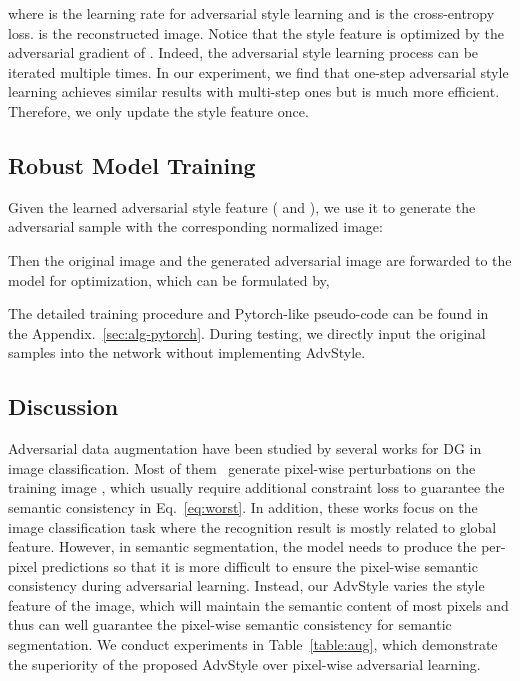 \documentclass{article}
\newcommand{\ours}{AdvStyle\xspace}
\begin{document}
where  is the learning rate for adversarial style learning and  is the cross-entropy loss.  is the reconstructed image. Notice that the style feature is optimized by the adversarial gradient of . Indeed, the adversarial style learning process can be iterated multiple times.
In our experiment, we find that one-step adversarial style learning achieves similar results with multi-step ones but is much more efficient. Therefore, we only update the style feature once.

\subsection{Robust Model Training}

Given the learned adversarial style feature ( and ), we use it to generate the adversarial sample  with the corresponding normalized image:

Then the original image  and the generated adversarial image  are forwarded to the model for optimization, which can be formulated by,

The detailed training procedure and Pytorch-like pseudo-code can be found in the Appendix.~\ref{sec:alg-pytorch}. During testing, we directly input the original samples into the network without implementing \ours.


\subsection{Discussion} 

Adversarial data augmentation have been studied by several works for DG in image classification. Most of them~\cite{qiao2020learning, volpi2018generalizing} generate pixel-wise perturbations on the training image , which usually require additional constraint loss to guarantee the semantic consistency in Eq.~\ref{eq:worst}. In addition, these works focus on the image classification task where the recognition result is mostly related to global feature. However, in semantic segmentation, the model needs to produce the per-pixel predictions so that it is more difficult to ensure the pixel-wise semantic consistency during adversarial learning. Instead, our \ours varies the style feature of the image, which will maintain the semantic content of most pixels and thus can well guarantee the pixel-wise semantic consistency for semantic segmentation. We conduct experiments in Table~\ref{table:aug}, which demonstrate the superiority of the proposed \ours over pixel-wise adversarial learning. 
\end{document}
